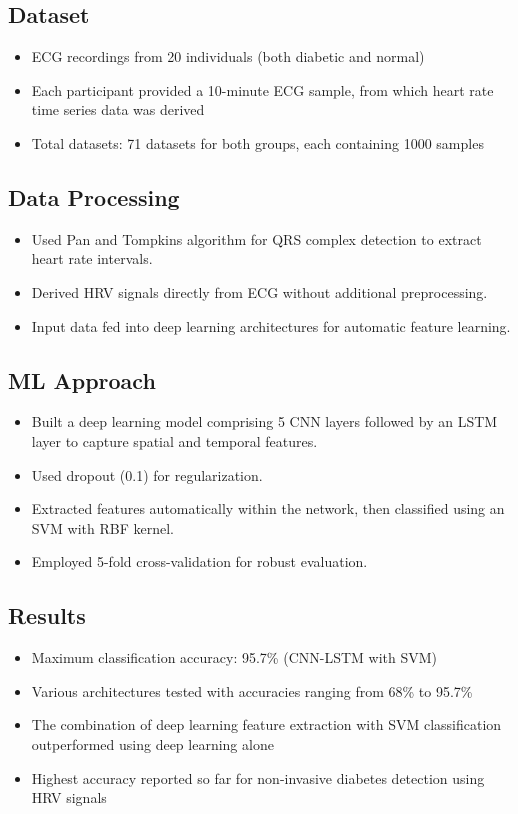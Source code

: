 \subsection*{Dataset}
\begin{itemize}
    \item ECG recordings from 20 individuals (both diabetic and normal)
    \item Each participant provided a 10-minute ECG sample, from which heart rate time series data was derived
    \item Total datasets: 71 datasets for both groups, each containing 1000 samples
\end{itemize}

\subsection*{Data Processing}
\begin{itemize}
    \item Used Pan and Tompkins algorithm for QRS complex detection to extract heart rate intervals.
    \item Derived HRV signals directly from ECG without additional preprocessing.
    \item Input data fed into deep learning architectures for automatic feature learning.
\end{itemize}

\subsection*{ML Approach}
\begin{itemize}
    \item Built a deep learning model comprising 5 CNN layers followed by an LSTM layer to capture spatial and temporal features.
    \item Used dropout (0.1) for regularization.
    \item Extracted features automatically within the network, then classified using an SVM with RBF kernel.
    \item Employed 5-fold cross-validation for robust evaluation.
\end{itemize}
\subsection*{Results}
\begin{itemize}
    \item Maximum classification accuracy: 95.7\% (CNN-LSTM with SVM)
    \item Various architectures tested with accuracies ranging from 68\% to 95.7\%
    \item The combination of deep learning feature extraction with SVM classification outperformed using deep learning alone
    \item Highest accuracy reported so far for non-invasive diabetes detection using HRV signals
\end{itemize}

